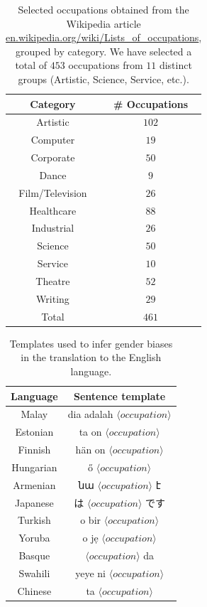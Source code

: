 \documentclass{article}
\begin{document}
\begin{table}[H]
	\centering
	\begin{tabular}{|c|c|}
	\hline
	Category 		& \# Occupations 	\\ \hline \hline
	Artistic 		& $102$ 			\\ \hline
	Computer 		& $19$ 				\\ \hline
	Corporate 		& $50$ 				\\ \hline
	Dance 			& $9$ 				\\ \hline
	Film/Television & $26$ 				\\ \hline
	Healthcare 		& $88$ 				\\ \hline
	Industrial 		& $26$ 				\\ \hline
	Science 		& $50$ 				\\ \hline
	Service 		& $10$ 				\\ \hline
	Theatre 		& $52$ 				\\ \hline
	Writing 		& $29$ 				\\ \hline
	\hline
	Total			& $461$				\\ \hline
	\end{tabular}
	\caption{Selected occupations obtained from the Wikipedia article \url{en.wikipedia.org/wiki/Lists_of_occupations}, grouped by category. We have selected a total of $453$ occupations from $11$ distinct groups (Artistic, Science, Service, etc.).}
\end{table}

\begin{table}[H]
	\centering
	\begin{tabular}{|c|c|}
	\hline
	Language 	& Sentence template \\ \hline \hline
	Malay		& dia adalah $\langle occupation \rangle$ \\ \hline
	Estonian	& ta on $\langle occupation \rangle$ \\ \hline
	Finnish		& hän on $\langle occupation \rangle$ \\ \hline
	Hungarian	& ő $\langle occupation \rangle$ \\ \hline
	Armenian	& նա $\langle occupation \rangle$ է \\ \hline
	Japanese	& は $\langle occupation \rangle$ です\\ \hline
	Turkish		& o bir $\langle occupation \rangle$ \\ \hline
	Yoruba		& o jẹ $\langle occupation \rangle$ \\ \hline
	Basque		& $\langle occupation \rangle$ da \\ \hline
	Swahili		& yeye ni $\langle occupation \rangle$ \\ \hline
	Chinese		& ta $\langle occupation \rangle$ \\ \hline
	\end{tabular}
	\caption{Templates used to infer gender biases in the translation to the English language.}
\end{table}
\end{document}
